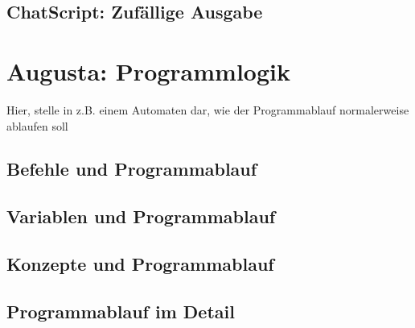 \section{ChatScript: Zufällige Ausgabe}
\label{sec:ChatScript: Zufällige Ausgabe}

\chapter{Augusta: Programmlogik}
\label{sec:Augusta: Programmlogik}



Hier, stelle in z.B. einem Automaten dar, wie der Programmablauf normalerweise ablaufen soll
\section{Befehle und Programmablauf}
\label{sec:Befehle und Programmablauf}

\section{Variablen und Programmablauf}
\label{sec:Variablen und Programmablauf}

\section{Konzepte und Programmablauf}
\label{sec:Konzepte und Programmablauf}

\section{Programmablauf im Detail}
\label{sec:Programmablauf im Detail}

